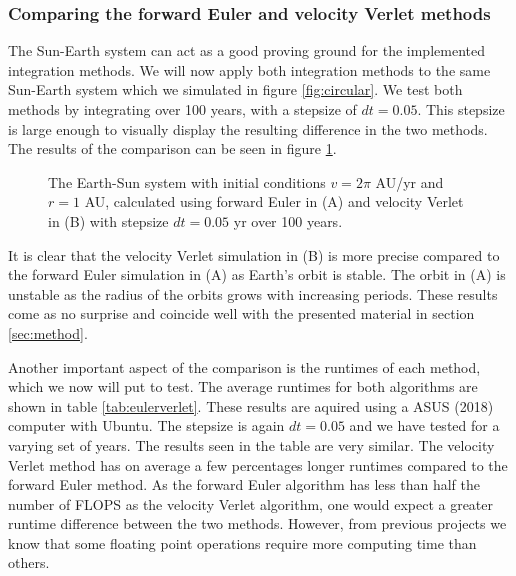 \documentclass[a4paper, 10pt, reqno]{amsart}
\begin{document}
\subsubsection{Comparing the forward Euler and velocity Verlet methods} 
The Sun-Earth system can act as a good proving ground for the implemented integration methods. We will now apply both integration methods to the same Sun-Earth system which we simulated in figure \ref{fig:circular}. We test both methods by integrating over 100 years, with a stepsize of $dt = 0.05$. This stepsize is large enough to visually display the resulting difference in the two methods. The results of the comparison can be seen in figure \ref{fig:eulerverlet}.

 \begin{figure}
     \centering
     \caption{The Earth-Sun system with initial conditions $v = 2\pi$ AU/yr and  $r = 1$ AU, calculated using forward Euler in (A) and velocity Verlet in (B) with stepsize $dt=0.05$ yr over 100 years.}
     \label{fig:eulerverlet}
 \end{figure}

It is clear that the velocity Verlet simulation in (B) is more precise compared to the forward Euler simulation in (A) as Earth's orbit is stable. The orbit in (A) is unstable as the radius of the orbits grows with increasing periods. These results come as no surprise and coincide well with the presented material in section \ref{sec:method}. 

Another important aspect of the comparison is the runtimes of each method, which we now will put to test. The average runtimes for both algorithms are shown in table \ref{tab:eulerverlet}. These results are aquired using a ASUS (2018) computer with Ubuntu. The stepsize is again $dt=0.05$ and we have tested for a varying set of years. The results seen in the table are very similar. The velocity Verlet method has on average a few percentages longer runtimes compared to the forward Euler method. As the forward Euler algorithm has less than half the number of FLOPS as the velocity Verlet algorithm, one would expect a greater runtime difference between the two methods. However, from previous projects we know that some floating point operations require more computing time than others.
\end{document}
